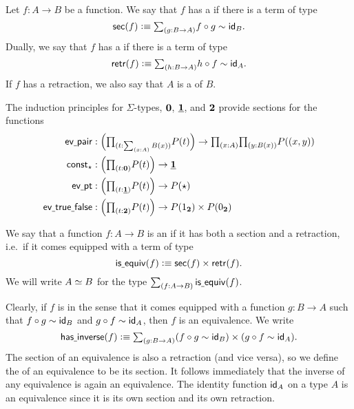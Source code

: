 \begin{defn}
Let $f:A\to B$ be a function. We say that $f$ has a  if there is a term of type
\begin{equation*}
\sections(f) \defeq \sm{g:B\to A} f\circ g\htpy \idfunc[B].
\end{equation*}
Dually, we say that $f$ has a  if there is a term of type
\begin{equation*}
\retractions(f) \defeq \sm{h:B\to A} h\circ f\htpy \idfunc[A].
\end{equation*}
If $f$ has a retraction, we also say that $A$ is a  of $B$.
\end{defn}

\begin{eg}
The induction principles for $\Sigma$-types, $\emptyt$, $\unit$, and $\bool$ provide sections for the functions
\begin{align*}
\evpair & : \Big(\prd{t:\sm{x:A}B(x)}P(t)\Big)\to \prd{x:A}{y:B(x)}P((x,y)) \\
\const_\ttt & : \Big(\prd{t:\emptyt}P(t)\Big)\to \unit \\
\evpt & : \Big(\prd{t:\unit}P(t)\Big) \to P(\ttt) \\
\evtruefalse & : \Big(\prd{t:\bool}P(t)\Big) \to P(\btrue)\times P(\bfalse) \\
\end{align*}
\end{eg}

\begin{defn}
We say that a function $f:A\to B$ is an  if it has both a section and a retraction, i.e.~if it comes equipped with a term of type
\begin{equation*}
\isequiv(f)\defeq\sections(f)\times\retractions(f).
\end{equation*}
We will write $\eqv{A}{B}$ for the type $\sm{f:A\to B}\isequiv(f)$.
\end{defn}

Clearly, if $f$ is  in the sense that it comes equipped with a function $g:B\to A$ such that $f\circ g\htpy\idfunc[B]$ and $g\circ f\htpy\idfunc[A]$, then $f$ is an equivalence. We write
\begin{equation*}
\hasinverse(f)\defeq\sm{g:B\to A} (f\circ g\htpy \idfunc[B])\times (g\circ f\htpy\idfunc[A]).
\end{equation*}
The section of an equivalence is also a retraction (and vice versa), so we define the  of an equivalence to be its section. It follows immediately that the inverse of any equivalence is again an equivalence. The identity function $\idfunc[A]$ on a type $A$ is an equivalence since it is its own section and its own retraction.

